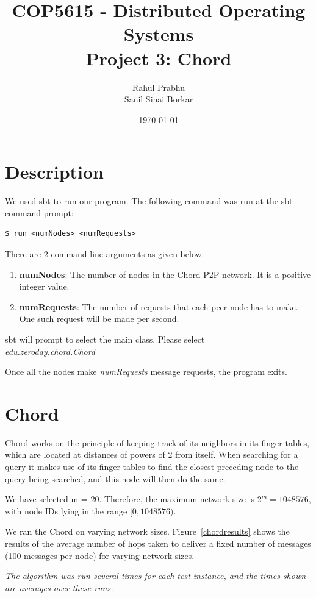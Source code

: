 \documentclass[11pt]{article}
\title{\textbf{COP5615 - Distributed Operating Systems\\Project 3: Chord}}
\author{Rahul Prabhu\\
		Sanil Sinai Borkar}
\date{\today}
\begin{document}
\maketitle
\section{Description}

We used sbt to run our program. The following command was run at the sbt command prompt:
\begin{lstlisting}
$ run <numNodes> <numRequests>
\end{lstlisting}


There are 2 command-line arguments as given below:
\begin{enumerate}
\item \textbf{numNodes}: The number of nodes in the Chord P2P network. It is a positive integer value.
\item \textbf{numRequests}: The number of requests that each peer node has to make. One such request will be made per second.
\end{enumerate}

sbt will prompt to select the main class. Please select\\ {\it edu.zeroday.chord.Chord}

Once all the nodes make {\it numRequests} message requests, the program exits.

\section{Chord}
Chord works on the principle of keeping track of its neighbors in its finger tables, which are located at distances of powers of 2 from itself. When searching for a query it makes use of its finger tables to find the closest preceding node to the query being searched, and this node will then do the same.

We have selected m = 20. Therefore, the maximum network size is $2^m = 1048576$, with node IDs lying in the range $[0, 1048576)$.

We ran the Chord on varying network sizes. Figure~\ref{chordresults} shows the results of the average number of hops taken to deliver a fixed number of messages (100 messages per node) for varying network sizes. 

\textit{The algorithm was run several times for each test instance, and the times shown are averages over these runs.}
\end{document}
